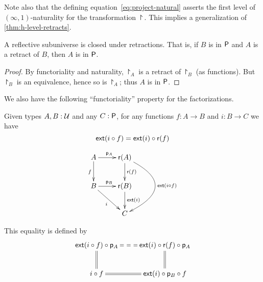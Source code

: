 



Note also that the defining equation~\eqref{eq:project-natural} asserts the first level of $(\infty,1)$-naturality for the transformation
$\project$.
This implies a generalization of \autoref{thm:h-level-retracts}.

\begin{lem}\label{thm:reflsubuniv-retract}
  A reflective subuniverse is closed under retractions.
  That is, if $B$ is in $\P$ and $A$ is a retract of $B$, then $A$ is in $\P$.
\end{lem}
\begin{proof}
  By functoriality and naturality, $\project_A$ is a retract of $\project_B$ (as functions).
  But $\project_B$ is an equivalence, hence so is $\project_A$; thus $A$ is in $\P$.
\end{proof}

We also have the following ``functoriality'' property for the factorizations.

\begin{defn}
  Given types $A,B:\type$ and any $C:\P$, for any functions $f:A\to{}B$ and $i:B\to{}C$ we have
  \[\ext(i\circ{}f)=\ext(i)\circ\reflect(f)\]

  \[\xymatrix{
    A \ar^{\project_A}[r] \ar_f[d] & \reflect(A) \ar^{\reflect(f)}[d]
    \ar@/^15mm/^{\ext(i\circ f)}[dd] \\
    B \ar^{\project_B}[r] \ar_i[rd] & \reflect(B) \ar^{\ext(i)}[d] \\
    & C}\]

  This equality is defined by
  \[\xymatrix{
    \ext(i\circ f)\circ\project_A \ar@{==}[r] \ar@{=}[d] &
    \ext(i)\circ\reflect(f)\circ\project_A \ar@{=}[d] \\
    i\circ f \ar@{=}[r] & \ext(i)\circ\project_B\circ f
  }\]

\end{defn}

